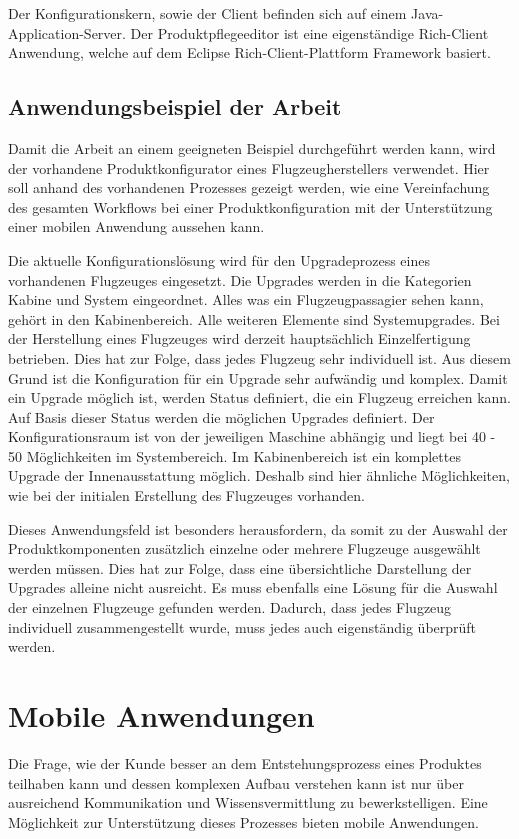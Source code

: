 Der Konfigurationskern, sowie der Client befinden sich auf einem Java-Application-Server. Der Produktpflegeeditor ist eine eigenständige Rich-Client Anwendung, welche auf dem Eclipse Rich-Client-Plattform Framework\cite{bib:eclipseRCP} basiert.

\subsection{Anwendungsbeispiel der Arbeit} \label{airbusConfigurator}
Damit die Arbeit an einem geeigneten Beispiel durchgeführt werden kann, wird der vorhandene Produktkonfigurator eines Flugzeugherstellers verwendet. Hier soll anhand des vorhandenen Prozesses gezeigt werden, wie eine Vereinfachung des gesamten Workflows bei einer Produktkonfiguration mit der Unterstützung einer mobilen Anwendung aussehen kann. \par 

Die aktuelle Konfigurationslösung wird für den Upgradeprozess eines vorhandenen Flugzeuges eingesetzt. Die Upgrades werden in die Kategorien Kabine und System eingeordnet. Alles was ein Flugzeugpassagier sehen kann, gehört in den Kabinenbereich. Alle weiteren Elemente sind Systemupgrades. Bei der Herstellung eines Flugzeuges wird derzeit hauptsächlich Einzelfertigung betrieben. Dies hat zur Folge, dass jedes Flugzeug sehr individuell ist. Aus diesem Grund ist die Konfiguration für ein Upgrade sehr aufwändig und komplex. Damit ein Upgrade möglich ist, werden Status definiert, die ein Flugzeug erreichen kann. Auf Basis dieser Status werden die möglichen Upgrades definiert. Der Konfigurationsraum ist von der jeweiligen Maschine abhängig und liegt bei 40 - 50 Möglichkeiten im Systembereich. Im Kabinenbereich ist ein komplettes Upgrade der Innenausstattung möglich. Deshalb sind hier ähnliche Möglichkeiten, wie bei der initialen Erstellung des Flugzeuges vorhanden.
\par


Dieses Anwendungsfeld ist besonders herausfordern, da somit zu der Auswahl der Produktkomponenten zusätzlich einzelne oder mehrere Flugzeuge ausgewählt werden müssen. Dies hat zur Folge, dass eine übersichtliche Darstellung der Upgrades alleine nicht ausreicht. Es muss ebenfalls eine Lösung für die Auswahl der einzelnen Flugzeuge gefunden werden.  Dadurch, dass jedes Flugzeug individuell zusammengestellt wurde, muss jedes auch eigenständig überprüft werden. 


\section{Mobile Anwendungen} \label{mobileAppsGrundlagen}
Die Frage, wie der Kunde besser an dem Entstehungsprozess eines Produktes teilhaben kann und dessen komplexen Aufbau verstehen kann ist nur über ausreichend Kommunikation und Wissensvermittlung zu bewerkstelligen. Eine Möglichkeit zur Unterstützung dieses Prozesses bieten mobile Anwendungen.\par

